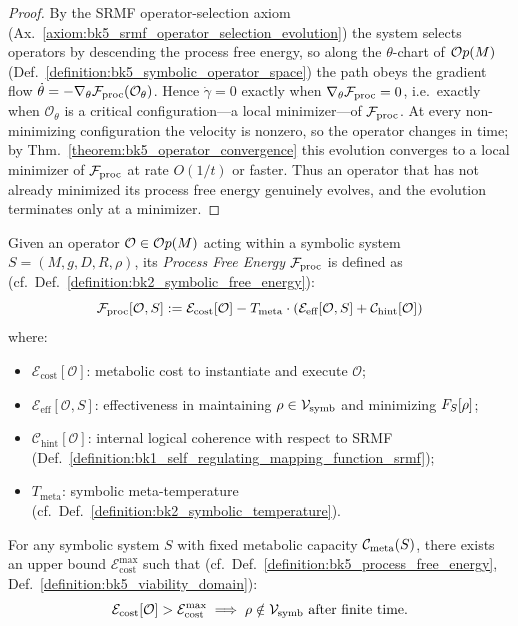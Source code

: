 \begin{proof}
\label{proof:bk5_operator_evolution}
\leavevmode
By the SRMF operator-selection axiom (Ax.~\ref{axiom:bk5_srmf_operator_selection_evolution}) the system selects operators by descending the process free energy, so along the $\theta$-chart of $\mathcal{O}p(M)$ (Def.~\ref{definition:bk5_symbolic_operator_space}) the path obeys the gradient flow $\dot{\theta} = -\nabla_{\theta}\mathcal{F}_{\text{proc}}(\mathcal{O}_{\theta})$. Hence $\dot{\gamma} = 0$ exactly when $\nabla_{\theta}\mathcal{F}_{\text{proc}} = 0$, i.e.\ exactly when $\mathcal{O}_{\theta}$ is a critical configuration---a local minimizer---of $\mathcal{F}_{\text{proc}}$. At every non-minimizing configuration the velocity is nonzero, so the operator changes in time; by Thm.~\ref{theorem:bk5_operator_convergence} this evolution converges to a local minimizer of $\mathcal{F}_{\text{proc}}$ at rate $O(1/t)$ or faster. Thus an operator that has not already minimized its process free energy genuinely evolves, and the evolution terminates only at a minimizer.
\end{proof}
\begin{definition} \label{definition:bk5_process_free_energy}
Given an operator $\mathcal{O} \in \mathcal{O}p(M)$ acting within a symbolic system $S = (M, g, D, R, \rho)$, its \emph{Process Free Energy} $\mathcal{F}_{\text{proc}}$ is defined as (cf.~Def.~\ref{definition:bk2_symbolic_free_energy}):
\[
\mathcal{F}_{\text{proc}}[\mathcal{O}, S] := \mathcal{E}_{\text{cost}}[\mathcal{O}] - T_{\text{meta}} \cdot \left( \mathcal{E}_{\text{eff}}[\mathcal{O}, S] + \mathcal{C}_{\text{hint}}[\mathcal{O}] \right)
\]
where:
\begin{itemize}
    \item $\mathcal{E}_{\text{cost}}[\mathcal{O}]$: metabolic cost to instantiate and execute $\mathcal{O}$;
    \item $\mathcal{E}_{\text{eff}}[\mathcal{O}, S]$: effectiveness in maintaining $\rho \in \mathcal{V}_{\mathrm{symb}}$ and minimizing $F_S[\rho]$;
    \item $\mathcal{C}_{\text{hint}}[\mathcal{O}]$: internal logical coherence with respect to SRMF (Def.~\ref{definition:bk1_self_regulating_mapping_function_srmf});
    \item $T_{\text{meta}}$: symbolic meta-temperature (cf.~Def.~\ref{definition:bk2_symbolic_temperature}).
\end{itemize}
\end{definition}
\begin{proposition}
\label{proposition:bk5_fixed_metabolic_capacity}
For any symbolic system $S$ with fixed metabolic capacity $\mathcal{C}_{\text{meta}}(S)$, there exists an upper bound $\mathcal{E}_{\text{cost}}^{\max}$ such that (cf.~Def.~\ref{definition:bk5_process_free_energy}, Def.~\ref{definition:bk5_viability_domain}):
\[
\mathcal{E}_{\text{cost}}[\mathcal{O}] > \mathcal{E}_{\text{cost}}^{\max} \implies \rho \notin \viabilitydomain \ \text{after finite time}.
\]
\end{proposition}
